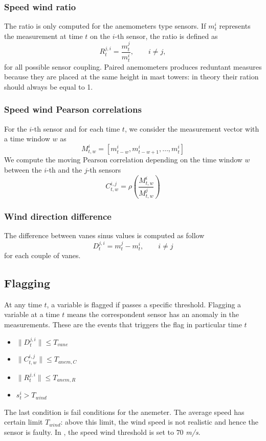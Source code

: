 \documentclass[journal]{IEEEtran}
\begin{document}
\subsubsection{Speed wind ratio}
The ratio is only computed for the anemometers type sensors. If $m_t^{i}$ represents the measurement at time $t$ on the $i$-th sensor, the ratio is defined as
\begin{equation}
R_{t}^{j,i} = \frac{m_{t}^{j}}{m_{t}^{i}},\qquad i \neq j,
\end{equation} 
for all possible sensor coupling. Paired anemometers produces reduntant measures because they are placed at the same  height in mast towers: in theory their ration should always be equal to 1.

\subsubsection{Speed wind Pearson correlations}
For the $i$-th sensor and for each time $t$, we consider the measurement vector with a time window $w$ as 
\begin{equation}
M^i_{t,w} = [m_{t-w}^i,m_{t-w+1}^i,\ldots,m_t^i]
\end{equation}
We compute the moving Pearson correlation depending on the time window $w$ between the $i$-th and the $j$-th sensors
\begin{equation}
C^{i,j}_{t,w}= \rho\left( \frac{M^i_{t,w}}{M^j_{t,w}}\right)
\end{equation}

\subsubsection{Wind direction difference}
The difference between vanes sinus values is computed as follow
\begin{equation}
D_{t}^{j,i} = {m_{t}^{j} - m_{t}^{i}},\qquad i \neq j 
\end{equation} 
for each couple of vanes.


\subsection{Flagging}\label{subsec:flagging}
At any time $t$, a variable is flagged if passes a specific threshold. Flagging a variable at a time $t$ means the correspondent sensor has an anomaly in the measurements.
These are the events that triggers the flag in particular time $t$
\begin{itemize}
\item $\|D_{t}^{j,i}\| \leq T_{vane}$
\item $\|C^{i,j}_{t,w}\| \leq T_{anem,C}$
\item $\|R_{t}^{j,i}\| \leq T_{anem,R}$
\item $s_t^i>T_{wind}$
\end{itemize}
The last condition is fail conditions for the anemeter. The average speed has certain limit $T_{wind}$: above this limit, the wind speed is not realistic and hence the sensor is faulty. In \cite{}, the speed wind threshold is set to $70$ \emph{m/s}.
\end{document}

